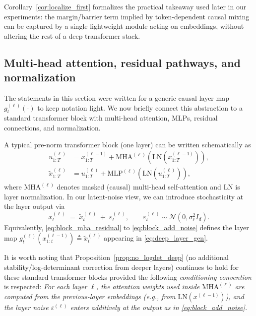 \documentclass[11pt]{article}
\begin{document}
Corollary~\ref{cor:localize_first} formalizes the practical takeaway used later in our experiments:
the margin/barrier term implied by token-dependent causal mixing can be captured by a single lightweight
module acting on embeddings, without altering the rest of a deep transformer stack.

\subsection{Multi-head attention, residual pathways, and normalization}
\label{subsec:deep_mha_residual_ln}

The statements in this section were written for a generic causal layer map
$g^{(\ell)}_t(\cdot)$ to keep notation light. We now briefly connect this abstraction to a standard
transformer block with multi-head attention, MLPs, residual connections, and normalization.

A typical pre-norm transformer block (one layer) can be written schematically as
\begin{align}
u^{(\ell)}_{1:T} &= x^{(\ell-1)}_{1:T} + \mathrm{MHA}^{(\ell)}\!\left(\mathrm{LN}\!\left(x^{(\ell-1)}_{1:T}\right)\right), \label{eq:block_mha_residual}\\
\tilde{x}^{(\ell)}_{1:T} &= u^{(\ell)}_{1:T} + \mathrm{MLP}^{(\ell)}\!\left(\mathrm{LN}\!\left(u^{(\ell)}_{1:T}\right)\right), \label{eq:block_mlp_residual}
\end{align}
where $\mathrm{MHA}^{(\ell)}$ denotes masked (causal) multi-head self-attention and $\mathrm{LN}$ is
layer normalization. In our latent-noise view, we can introduce stochasticity at the layer output via
\begin{equation}
x^{(\ell)}_t \;=\; \tilde{x}^{(\ell)}_t \;+\; \varepsilon^{(\ell)}_t,
\qquad
\varepsilon^{(\ell)}_t\sim\mathcal{N}(0,\sigma_\ell^2 I_d).
\label{eq:block_add_noise}
\end{equation}
Equivalently, \eqref{eq:block_mha_residual} to \eqref{eq:block_add_noise} defines the layer map
$g^{(\ell)}_t(x^{(\ell-1)}_{1:t})\triangleq \tilde{x}^{(\ell)}_t$ appearing in
\eqref{eq:deep_layer_gen}.

It is worth noting that Proposition~\ref{prop:no_logdet_deep} (no additional stability/log-determinant correction from deeper layers)
continues to hold for these standard transformer blocks provided the following \emph{conditioning convention} is respected: \emph{For each layer $\ell$, the attention weights used inside $\mathrm{MHA}^{(\ell)}$ are computed from
the previous-layer embeddings (e.g., from $\mathrm{LN}(x^{(\ell-1)})$), and the layer noise
$\varepsilon^{(\ell)}$ enters additively at the output as in \eqref{eq:block_add_noise}.}
\end{document}
